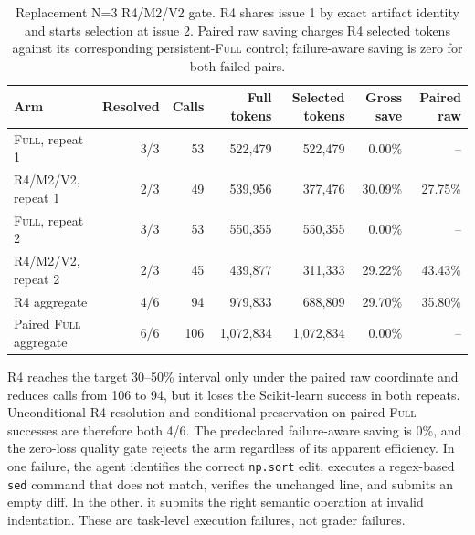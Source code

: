 \documentclass[11pt]{article}
\begin{document}
\begin{table}[H]
\centering
\scriptsize
\caption{Replacement N=3 R4/M2/V2 gate.  R4 shares issue 1 by exact
artifact identity and starts selection at issue 2.  Paired raw saving charges
R4 selected tokens against its corresponding persistent-\textsc{Full}
control; failure-aware saving is zero for both failed pairs.}
\label{tab:persistent-n3-r4-gate}
\begin{tabular}{lrrrrrr}
\toprule
Arm & Resolved & Calls & Full tokens & Selected tokens & Gross save & Paired raw \\
\midrule
\textsc{Full}, repeat 1 & 3/3 & 53 & 522,479 & 522,479 & 0.00\% & -- \\
R4/M2/V2, repeat 1 & 2/3 & 49 & 539,956 & 377,476 & 30.09\% & 27.75\% \\
\textsc{Full}, repeat 2 & 3/3 & 53 & 550,355 & 550,355 & 0.00\% & -- \\
R4/M2/V2, repeat 2 & 2/3 & 45 & 439,877 & 311,333 & 29.22\% & 43.43\% \\
\midrule
R4 aggregate & 4/6 & 94 & 979,833 & 688,809 & 29.70\% & 35.80\% \\
Paired \textsc{Full} aggregate & 6/6 & 106 & 1,072,834 & 1,072,834 & 0.00\% & -- \\
\bottomrule
\end{tabular}
\end{table}

R4 reaches the target 30--50\% interval only under the paired raw coordinate
and reduces calls from 106 to 94, but it loses the Scikit-learn success in both
repeats.  Unconditional R4 resolution and conditional preservation on paired
\textsc{Full} successes are therefore both 4/6.  The predeclared
failure-aware saving is 0\%, and the zero-loss quality gate rejects the arm
regardless of its apparent efficiency.  In one
failure, the agent identifies the correct \texttt{np.sort} edit, executes a
regex-based \texttt{sed} command that does not match, verifies the unchanged
line, and submits an empty diff.  In the other, it submits the right semantic
operation at invalid indentation.  These are task-level execution failures,
not grader failures.
\end{document}
